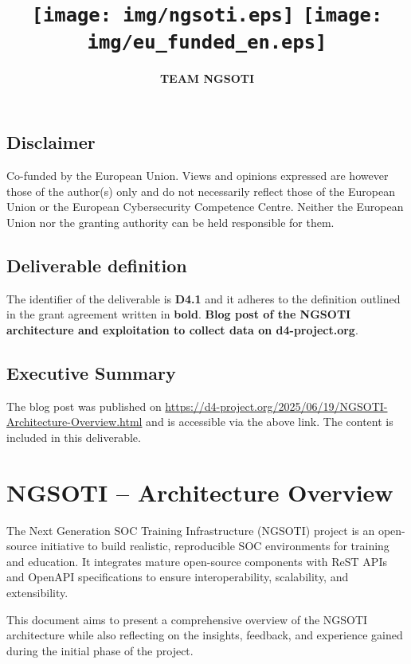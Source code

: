 \documentclass[10pt,a4paper]{report}
\title{
    \Huge \textbf{\delivtitle} \\[0.5cm]
    \texttt{[image: img/ngsoti.eps]}
    \hspace{1cm}
    \texttt{[image: img/eu\_funded\_en.eps]}
}
\author{\textbf{TEAM NGSOTI}}
\date{\delivdate}
\begin{document}
\maketitle
\thispagestyle{empty} %

\newpage
\tableofcontents
\newpage
\section*{Disclaimer}
Co-funded by the European Union. Views and opinions expressed are however those of the author(s) only
and do not necessarily reflect those of the European Union or the European Cybersecurity Competence Centre. Neither
the European Union nor the granting authority can be held responsible for them.
\section*{Deliverable definition}
The identifier of the deliverable is \textbf{D4.1} and it adheres to the definition outlined in the grant agreement written in \textbf{bold}. \textbf{Blog post of the NGSOTI architecture and exploitation  to collect data on d4-project.org}.

\section*{Executive Summary}

The blog post was published on \url{https://d4-project.org/2025/06/19/NGSOTI-Architecture-Overview.html}
and is accessible via the above link. The content is included in this deliverable.


\chapter{NGSOTI – Architecture Overview}
The Next Generation SOC Training Infrastructure (NGSOTI) project is an open-source initiative to build realistic, reproducible SOC environments for training and education. It integrates mature open-source components with ReST APIs and OpenAPI specifications to ensure interoperability, scalability, and extensibility.

This document aims to present a comprehensive overview of the NGSOTI architecture while also reflecting on the insights, feedback, and experience gained during the initial phase of the project.
\end{document}
